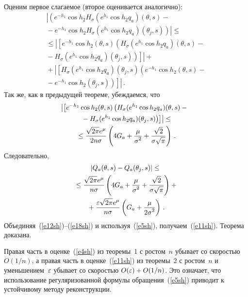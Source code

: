 \begin{multicols}{2}
\begin{multline*}
\end{multline*}
Оценим первое слагаемое (второе оценивается аналогично):
\begin{multline*}
\left|
\left(e^{-h_1}\cos{h_2}H_\sigma(e^{h_1}\cos{h_2}q_a)(\theta,s)-{}\right.\right.\\
{}-\left.\left.e^{-h_1}\cos{h_2}H_\sigma(e^{h_1}\cos{h_2}q_a)(\theta_j,s)\right)\right|\leq{}\\
{}\leq\left|\left[e^{-h_1}\cos{h_2}(\theta,s)\left(H_\sigma(e^{h_1}\cos{h_2}q_a)(\theta,s)-{}\right.\right.\right.\\
{}-\left.\left.\left. H_\sigma(e^{h_1}\cos{h_2}q_a)(\theta_j,s)\right)\right]\right|+{}\\
{}+\left|
\left[H_\sigma(e^{h_1}\cos{h_2}q_a)(\theta_j,s)\left(e^{-h_1}\cos{h_2}(\theta,s)-{}\right.\right.\right.\\
{}-\left.\left.\left.e^{-h_1}\cos{h_2}(\theta_j,s)\right)\right]\right|\,.
\end{multline*}
Так же, как в предыдущей теореме, убеждаемся, что
\begin{multline*}
\left|\left[e^{-h_1}\cos{h_2}(\theta,s)\left(H_\sigma(e^{h_1}\cos{h_2}q_a)(\theta,s)-{}\right.\right.\right.\\
\left.\left.\left.{}-H_\sigma(e^{h_1}\cos{h_2}q_a)(\theta_j,s)\right)\right]\right|\leq{}\\
{}\leq\displaystyle\frac{\displaystyle \sqrt{2\pi}e^\mu\mathstrut}{\displaystyle 2n\sigma\mathstrut}\left(4G_a+\displaystyle\frac{\displaystyle \mu\mathstrut}{\displaystyle \sigma^2\mathstrut}+\displaystyle\frac{\displaystyle \sqrt{2}\mathstrut}{\displaystyle \sigma\sqrt{\pi}\mathstrut}\right)\,.
\end{multline*}
Следовательно,
\begin{multline}
\left|Q_a(\theta,s)-Q_a(\theta_j,s)\right|\leq{}\\
{}\leq\displaystyle\frac{\displaystyle \sqrt{2\pi}e^\mu\mathstrut}{\displaystyle n\sigma\mathstrut}\left(4G_a+\displaystyle\frac{\displaystyle \mu\mathstrut}{\displaystyle \sigma^2\mathstrut}+\displaystyle\frac{\displaystyle \sqrt{2}\mathstrut}{\displaystyle \sigma\sqrt{\pi}\mathstrut}\right)+{}\\
{}+
\displaystyle\frac{\displaystyle \varepsilon\sqrt{2\pi} e^\mu\mathstrut}{\displaystyle n\sigma\mathstrut}\left(G_a+\displaystyle\frac{\displaystyle \mu\mathstrut}{\displaystyle 2\sigma^2\mathstrut}\right)\,.
\label{e18sh}
\end{multline}
Объединяя~(\ref{e12sh})--(\ref{e18sh}) и используя~(\ref{e5sh}), получаем~(\ref{e11sh}). Теорема доказана.
\smallskip

Правая часть в оценке~(\ref{e4sh}) из теоремы~1 с ростом~$n$ убывает со
скоростью~$O(1/n)$, а правая часть в оценке~(\ref{e11sh}) из теоремы~2 с
ростом~$n$ и уменьшением~$\varepsilon$ убывает со скоростью
$O(\varepsilon)+O(1/n)$. Это означает, что использование регуляризованной формулы обращения~(\ref{e5sh}) 
приводит к устойчивому методу реконструкции.


\end{multicols}
